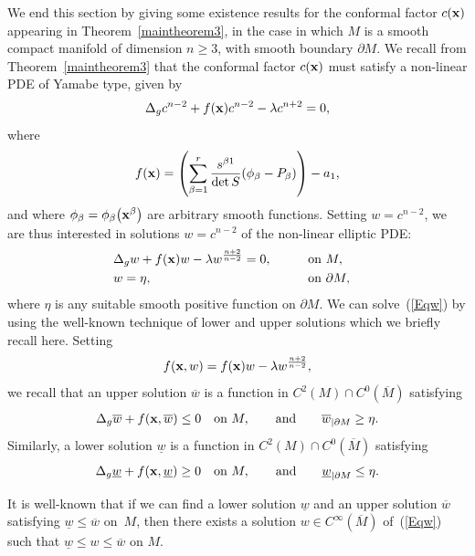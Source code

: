\documentclass[pdftex]{sigma}
\numberwithin{equation}{section}
\begin{document}
We end this section by giving some existence results for the conformal factor $c(\bf x)$ appearing in Theorem~\ref{maintheorem3}, in the case in which $M$ is a smooth compact manifold of dimension $n \geq 3$, with smooth boundary $\partial M$. We recall from Theorem~\ref{maintheorem3} that the conformal factor $c(\bf x)$ must satisfy a non-linear PDE of Yamabe type, given by
\begin{gather*}%
\Delta_{g}c^{n-2}+f({\bf x}) c^{n-2} - \lambda c^{n+2}=0,
\end{gather*}
where
\begin{gather*}%
f({\bf x})= \left( \sum_{\beta =1}^{r}\frac{s^{\beta 1}}{\det S}(\phi_{\beta}-P_{\beta})\right) - a_1 ,
\end{gather*}
and where $\phi_{\beta}=\phi_{\beta}\big({{\bf x}}^{\beta}\big)$ are arbitrary smooth functions. Setting $w = c^{n-2}$, we are thus interested in solutions $w = c^{n-2}$ of the non-linear elliptic PDE:
\begin{alignat}{3}
& \Delta_g w + f({\bf x})w - \lambda w^{\frac{n+2}{n-2}} =0 , \qquad && \textrm{on} \ M, &\nonumber\\
&  w = \eta, && \textrm{on} \ \partial M, & \label{Eqw}
\end{alignat}
where $\eta$ is any suitable smooth positive function on $\partial M$. We can solve~(\ref{Eqw}) by using the well-known technique of lower and upper solutions which we briefly recall here. Setting
\[
f({\bf x}, w) = f({\bf x})w - \lambda w^{\frac{n+2}{n-2}},
\]
we recall that an upper solution ${\overline{w}}$ is a function in $C^2(M) \cap C^0(\overline{M})$ satisfying
\begin{gather*}%
\Delta_g {\overline{w}}+ f({\bf x},{\overline{w}}) \leq 0 \quad \textrm{on} \ M, \qquad \textrm{and} \qquad {\overline{w}}_{|\partial M} \geq \eta.
\end{gather*}
Similarly, a lower solution ${\underline{w}}$ is a function in $C^2(M) \cap C^0(\overline{M})$ satisfying
\begin{gather*}%
\Delta_g {\underline{w}}+ f({\bf x},{\underline{w}}) \geq 0 \quad \textrm{on} \ M, \qquad \textrm{and} \qquad {\underline{w}}_{|\partial M} \leq \eta.
\end{gather*}

It is well-known that if we can find a lower solution ${\underline{w}}$ and an upper solution ${\overline{w}}$ satisfying ${\underline{w}} \leq {\overline{w}}$ on~$M$, then there exists a solution $w \in C^{\infty}(\overline{M})$ of~(\ref{Eqw}) such that ${\underline{w}} \leq w \leq {\overline{w}}$ on $M$.
\end{document}
